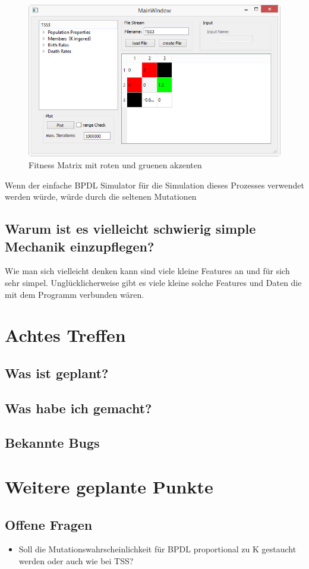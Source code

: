 \documentclass{article}
\begin{document}
	\begin{figure}[H]
		\centering
		\includegraphics[width=0.7\linewidth]{./MainWindow_red_green_loaded}
		\caption[MainWindow_redGreenFitness]{Fitness Matrix mit roten und gruenen akzenten}
		\label{fig:MainWindow_red_green_loaded}
	\end{figure}
	Wenn der einfache BPDL Simulator für die Simulation dieses Prozesses verwendet werden würde, würde durch die seltenen Mutationen


	
	\subsection{Warum ist es vielleicht schwierig simple Mechanik einzupflegen?}
	Wie man sich vielleicht denken kann sind viele kleine Features an und für sich sehr simpel.
	Unglücklicherweise gibt es viele kleine solche Features und Daten die mit dem Programm verbunden wären. 

\newpage
\section{Achtes Treffen}
\subsection{Was ist geplant?}
\subsection{Was habe ich gemacht?}
\subsection{Bekannte Bugs}


\section{Weitere geplante Punkte}
\subsection{Offene Fragen}
	\begin{itemize}
		\item Soll die Mutationswahrscheinlichkeit für BPDL proportional zu K gestaucht werden oder auch wie bei TSS?
	\end{itemize}
\end{document}

